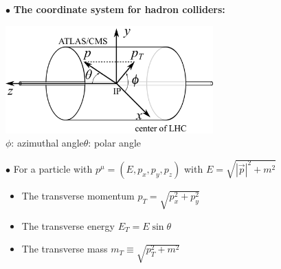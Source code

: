 \documentclass[9pt,a4paper,unknownkeysallowed,xcolor=dvipsnames,aspectratio=43]{beamer}
\begin{document}
%
%
\begin{frame}
\vspace{2mm}
{\color{darkred}\Large$\bullet$} {\bf The coordinate system for hadron colliders:}\\
\begin{center}
\includegraphics[width=0.6\textwidth]{coordinate.png}\\
\vspace{1mm}
$\phi$: azimuthal angle\qquad $\theta$: polar angle
\end{center}
\vspace{1mm}
{\color{darkred}\Large$\bullet$} For a particle with $p^\mu = (E, p_x, p_y, p_z)$ with $E=\sqrt{|\vec{p}|^2 + m^2}$
\vspace{2mm}
\begin{itemize}
    \item[\diamondsuit] The transverse momentum $p_T=\sqrt{p_x^2+p_y^2}$
    \vspace{2mm}
    \item[\diamondsuit] The transverse energy $E_T = E \sin\theta$
    \vspace{2mm}
    \item[\diamondsuit] The transverse mass $m_T \equiv \sqrt{p_T^2 + m^2}$
\end{itemize}
\end{frame}
%
%
\end{document}
